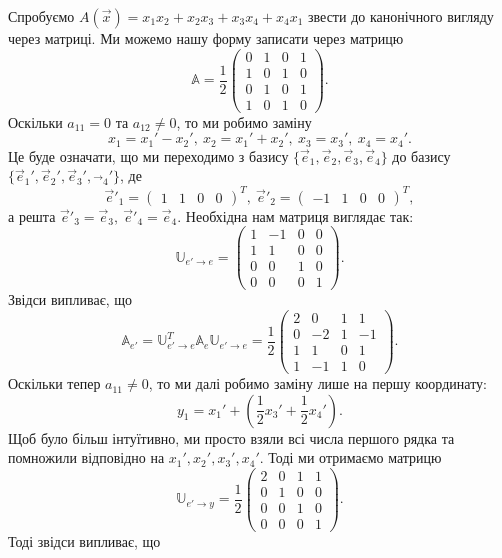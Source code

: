 \documentclass{math_library}
\begin{document}
\begin{example}
Спробуємо $A(\vec{x}) = x_1x_2 + x_2x_3 + x_3x_4 + x_4x_1$ звести до канонічного вигляду через матриці. Ми можемо нашу форму записати через матрицю 
\[
\mathbb{A} = \dfrac{1}{2} \begin{pmatrix}
0 & 1 & 0 & 1 \\
1 & 0 & 1 & 0 \\
0 & 1 & 0 & 1 \\
1 & 0 & 1 & 0
\end{pmatrix}.
\]
Оскільки $a_{11} = 0$ та $a_{12} \neq 0$, то ми робимо заміну
\[
 x_1 = x_1' - x_2',\ x_2 = x_1' + x_2',\ x_3 = x_3',\ x_4 = x_4'.
\] 
Це буде означати, що ми переходимо з базису $\{\vec{e}_1,\vec{e}_2,\vec{e}_3,\vec{e}_4\}$ до базису $\{\vec{e}_1',\vec{e}_2',\vec{e}_3',\vec{}_4'\}$, де
\[ 
\vec{e}'_1 = \begin{pmatrix}
1 & 1 & 0 & 0
\end{pmatrix}^T,\ \vec{e}'_2 = \begin{pmatrix}
-1 & 1 & 0 & 0
\end{pmatrix}^T,
\]
а решта $\vec{e}'_3 = \vec{e}_3,\ \vec{e}'_4 = \vec{e}_4$. Необхідна нам матриця виглядає так: 
\[
\mathbb{U}_{e' \to e} = \begin{pmatrix}
1 & -1 & 0 & 0 \\
1 & 1 & 0 & 0 \\
0 & 0 & 1 & 0 \\
0 & 0 & 0 & 1
\end{pmatrix}.
\]
Звідси випливає, що
\[ 
\mathbb{A}_{e'} = \mathbb{U}_{e' \to e}^T \mathbb{A}_e \mathbb{U}_{e' \to e} = \dfrac{1}{2} \begin{pmatrix}
2 & 0 & 1 & 1 \\
0 & -2 & 1 & -1 \\
1 & 1 & 0 & 1 \\
1 & -1 & 1 & 0
\end{pmatrix}.
\]
Оскільки тепер $a_{11} \neq 0$, то ми далі робимо заміну лише на першу координату: 
\[
y_1 = x_1' + \left( \dfrac{1}{2}x_3' + \dfrac{1}{2}x_4' \right).
\]
Щоб було більш інтуїтивно, ми просто взяли всі числа першого рядка та помножили відповідно на $x_1',x_2',x_3',x_4'$. Тоді ми отримаємо матрицю 
\[
\mathbb{U}_{e' \to y} = \dfrac{1}{2} \begin{pmatrix}
2 & 0 & 1 & 1 \\
0 & 1 & 0 & 0 \\
0 & 0 & 1 & 0 \\
0 & 0 & 0 & 1
\end{pmatrix}.
\]
Тоді звідси випливає, що 

\end{example}
\end{document}
